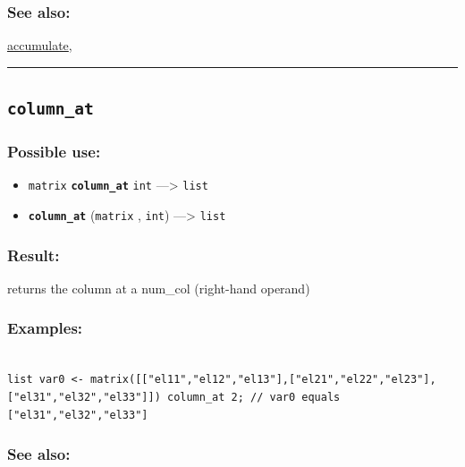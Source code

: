\documentclass[]{book}
\providecommand{\tightlist}{%
  \setlength{\itemsep}{0pt}\setlength{\parskip}{0pt}}
\theoremstyle{definition}
\theoremstyle{definition}
\theoremstyle{definition}
\theoremstyle{remark}
\begin{document}
\subsubsection{See also:}\label{see-also-55}

\href{operators-a-to-a.html\#accumulate}{accumulate},

\begin{center}\rule{0.5\linewidth}{\linethickness}\end{center}

\subsection{\texorpdfstring{\texttt{column\_at}}{column\_at}}\label{column_at}

\subsubsection{Possible use:}\label{possible-use-91}

\begin{itemize}
\tightlist
\item
  \texttt{matrix} \textbf{\texttt{column\_at}} \texttt{int}
  ---\textgreater{} \texttt{list}
\item
  \textbf{\texttt{column\_at}} (\texttt{matrix} , \texttt{int})
  ---\textgreater{} \texttt{list}
\end{itemize}

\subsubsection{Result:}\label{result-89}

returns the column at a num\_col (right-hand operand)

\subsubsection{Examples:}\label{examples-70}

\begin{verbatim}
 
list var0 <- matrix([["el11","el12","el13"],["el21","el22","el23"],["el31","el32","el33"]]) column_at 2; // var0 equals ["el31","el32","el33"]
\end{verbatim}

\subsubsection{See also:}\label{see-also-56}
\end{document}
